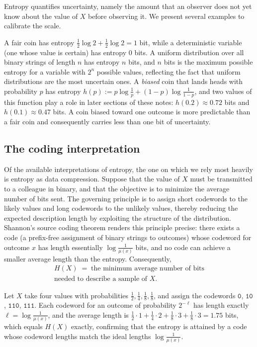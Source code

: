 \documentclass[11pt]{article}
\begin{document}
Entropy quantifies uncertainty, namely the amount that an observer does not yet know about the value of $X$ before observing it. We present several examples to calibrate the scale.

\begin{example}
\label{ex:entropy-calibration}
A fair coin has entropy $\frac12 \log 2 + \frac12 \log 2 = 1$ bit, while a deterministic variable (one whose value is certain) has entropy $0$ bits. A uniform distribution over all binary strings of length $n$ has entropy $n$ bits, and $n$ bits is the maximum possible entropy for a variable with $2^n$ possible values, reflecting the fact that uniform distributions are the most uncertain ones. A \emph{biased} coin that lands heads with probability $p$ has entropy $h(p) := p \log \frac1p + (1-p)\log\frac{1}{1-p}$, and two values of this function play a role in later sections of these notes: $h(0.2) \approx 0.72$ bits and $h(0.1) \approx 0.47$ bits. A coin biased toward one outcome is more predictable than a fair coin and consequently carries less than one bit of uncertainty.
\end{example}

\subsection{The coding interpretation}
\label{sec:coding}

Of the available interpretations of entropy, the one on which we rely most heavily is entropy as data compression. Suppose that the value of $X$ must be transmitted to a colleague in binary, and that the objective is to minimize the average number of bits sent. The governing principle is to assign short codewords to the likely values and long codewords to the unlikely values, thereby reducing the expected description length by exploiting the structure of the distribution. Shannon's source coding theorem renders this principle precise: there exists a code (a prefix-free assignment of binary strings to outcomes) whose codeword for outcome $x$ has length essentially $\log \frac{1}{\mu(x)}$ bits, and no code can achieve a smaller average length than the entropy. Consequently,
\begin{gather*}
H(X) \;=\; \text{the minimum average number of bits}\\
\text{needed to describe a sample of } X .
\end{gather*}

\begin{example}
Let $X$ take four values with probabilities $\frac12, \frac14, \frac18, \frac18$, and assign the codewords $\mathtt{0}$, $\mathtt{10}$, $\mathtt{110}$, $\mathtt{111}$. Each codeword for an outcome of probability $2^{-\ell}$ has length exactly $\ell = \log \frac{1}{\mu(x)}$, and the average length is $\frac12 \cdot 1 + \frac14 \cdot 2 + \frac18 \cdot 3 + \frac18 \cdot 3 = 1.75$ bits, which equals $H(X)$ exactly, confirming that the entropy is attained by a code whose codeword lengths match the ideal lengths $\log \frac{1}{\mu(x)}$.
\end{example}
\end{document}
